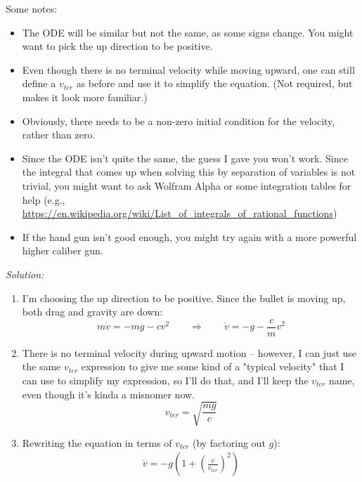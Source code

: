 \documentclass[12pt]{article}
\newcommand{\soln}[1] {\textit{Solution:} #1}
\begin{document}
\begin{enumerate}
\begin{enumerate}
                Some notes:
                \begin{itemize}
                  \item The ODE will be similar but not the same, as some signs change. You might want to pick the up direction to be positive.
                  \item Even though there is no terminal velocity  while moving upward, one can still define a $v_{ter}$ as before and use it to simplify the equation. (Not required, but makes it look more familiar.)
                  \item Obviously, there needs to be a non-zero initial condition for the velocity, rather than zero.
                  \item Since the ODE isn't quite the same, the guess I gave you won't work. Since the integral that comes up when solving this by separation of variables is not trivial, you might want to ask Wolfram Alpha or some integration tables for help (e.g., \url{https://en.wikipedia.org/wiki/List_of_integrals_of_rational_functions})
                  \item If the hand gun isn't good enough, you might try again with a more powerful higher caliber gun.
                \end{itemize}


                \soln{
                  \begin{enumerate}
                    \item I'm choosing the up direction to be positive. Since the bullet is moving up, both drag and gravity are down:
                          $$m\dot v = -mg - cv^2 \qquad \Longrightarrow \qquad \dot v = -g - \frac{c}{m} v^2$$

                    \item There is no terminal velocity during upward motion -- however, I can just use the same $v_{ter}$ expression to give me some kind of a "typical velocity" that I can use to simplify my expression, so I'll do that, and I'll keep the $v_{ter}$ name, even though it's kinda a misnomer now.
                          $$v_{ter} = \sqrt{\frac{mg}{c}}$$

                    \item Rewriting the equation in terms of $v_{ter}$ (by factoring out $g$):
                          \begin{align*}
                            \dot v = -g \left(1 + \left(\frac{v}{v_{ter}}\right)^2\right)
                          \end{align*}


\end{enumerate}}
\end{enumerate}
\end{enumerate}
\end{document}
